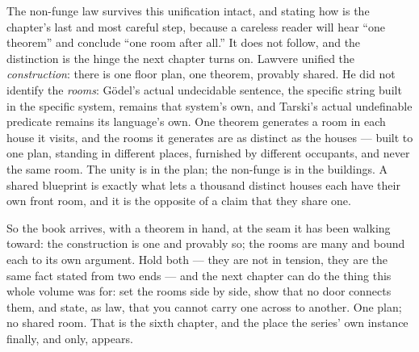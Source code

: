 The non-funge law survives this unification intact, and stating how is the
chapter's last and most careful step, because a careless reader will hear
``one theorem'' and conclude ``one room after all.'' It does not follow,
and the distinction is the hinge the next chapter turns on. Lawvere
unified the \emph{construction}: there is one floor plan, one theorem,
provably shared. He did not identify the \emph{rooms}: G\"odel's actual
undecidable sentence, the specific string built in the specific system,
remains that system's own, and Tarski's actual undefinable predicate
remains its language's own. One theorem generates a room in each house it
visits, and the rooms it generates are as distinct as the houses ---
built to one plan, standing in different places, furnished by different
occupants, and never the same room. The unity is in the plan; the
non-funge is in the buildings. A shared blueprint is exactly what lets a
thousand distinct houses each have their own front room, and it is the
opposite of a claim that they share one.

So the book arrives, with a theorem in hand, at the seam it has been
walking toward: the construction is one and provably so; the rooms are
many and bound each to its own argument. Hold both --- they are not in
tension, they are the same fact stated from two ends --- and the next
chapter can do the thing this whole volume was for: set the rooms side by
side, show that no door connects them, and state, as law, that you cannot
carry one across to another. One plan; no shared room. That is the sixth
chapter, and the place the series' own instance finally, and only, appears.
